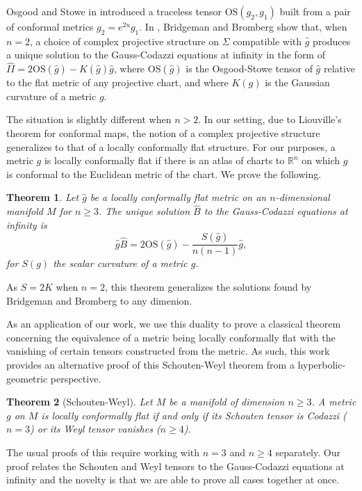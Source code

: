 \documentclass{amsart}
\newcommand{\R}{\mathbb{R}}
\newcommand{\two}{I\!\!I}
\newtheorem{bigthm}{Theorem}
\begin{document}
Osgood and Stowe in \cite{Osgood-Stowe1992} introduced a traceless tensor $\mathrm{OS}(g_2,g_1)$ built from a pair of conformal metrics $g_2 = e^{2u}g_1$.
In \cite{Bridgeman-Bromberg2022}, Bridgeman and Bromberg show that, when $n = 2$, a choice of complex projective structure on $\Sigma$ compatible with $\hat{g}$ produces a unique solution to the Gauss-Codazzi equations at infinity in the form of $\hat{\two} = 2\mathrm{OS}(\hat{g}) - K(\hat{g})\hat{g}$, where $\mathrm{OS}(\hat{g})$ is the Osgood-Stowe tensor of $\hat{g}$ relative to the flat metric of any projective chart, and where $K(g)$ is the Gaussian curvature of a metric $g$.

The situation is slightly different when $n > 2$.
In our setting, due to Liouville's theorem for conformal maps, the notion of a complex projective structure generalizes to that of a locally conformally flat structure. 
For our purposes, a metric $g$ is locally conformally flat if there is an atlas of charts to $\R^n$ on which $g$ is conformal to the Euclidean metric of the chart.
We prove the following.

\begin{bigthm}
\label{bigthm1}
Let $\hat{g}$ be a locally conformally flat metric on an $n$-dimensional manifold $M$ for $n \geq 3$.
The unique solution $\hat{B}$ to the Gauss-Codazzi equations at infinity is
\[
\hat{g}\hat{B} = 2\mathrm{OS}(\hat{g}) - \frac{S(\hat{g})}{n(n-1)}\hat{g},
\]
for $S(g)$ the scalar curvature of a metric $g$.
\end{bigthm}
\noindent
As $S = 2K$ when $n=2$, this theorem generalizes the solutions found by Bridgeman and Bromberg to any dimenion.

As an application of our work, we use this duality to prove a classical theorem concerning the equivalence of a metric being locally conformally flat with the vanishing of certain tensors constructed from the metric.
As such, this work provides an alternative proof of this Schouten-Weyl theorem from a hyperbolic-geometric perspective.

\begin{bigthm}[Schouten-Weyl]
Let $M$ be a manifold of dimension $n \geq 3$.
A metric $g$ on $M$ is locally conformally flat if and only if its Schouten tensor is Codazzi ($n = 3$) or its Weyl tensor vanishes ($n \geq 4$).
\end{bigthm}
\noindent
The usual proofs of this require working with $n=3$ and $n\geq 4$ separately.
Our proof relates the Schouten and Weyl tensors to the Gauss-Codazzi equations at infinity and the novelty is that we are able to prove all cases together at once. 
\end{document}
